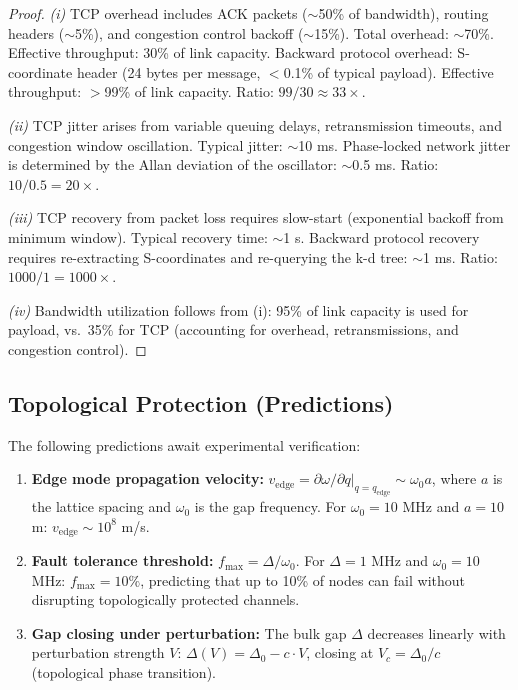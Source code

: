 \documentclass[11pt,twocolumn,a4paper]{article}
\theoremstyle{definition}
\begin{document}
\begin{proof}
\emph{(i)} TCP overhead includes ACK packets ($\sim$50\% of bandwidth), routing headers
($\sim$5\%), and congestion control backoff ($\sim$15\%). Total overhead: $\sim$70\%.
Effective throughput: 30\% of link capacity. Backward protocol overhead: S-coordinate
header (24 bytes per message, $<$0.1\% of typical payload). Effective throughput:
$>$99\% of link capacity. Ratio: $99/30 \approx 33\times$.

\emph{(ii)} TCP jitter arises from variable queuing delays, retransmission timeouts, and
congestion window oscillation. Typical jitter: $\sim$10 ms. Phase-locked network jitter
is determined by the Allan deviation of the oscillator: $\sim$0.5 ms. Ratio:
$10/0.5 = 20\times$.

\emph{(iii)} TCP recovery from packet loss requires slow-start (exponential backoff from
minimum window). Typical recovery time: $\sim$1 s. Backward protocol recovery requires
re-extracting S-coordinates and re-querying the k-d tree: $\sim$1 ms. Ratio:
$1000/1 = 1000\times$.

\emph{(iv)} Bandwidth utilization follows from (i): 95\% of link capacity is used for
payload, vs.\ 35\% for TCP (accounting for overhead, retransmissions, and congestion
control).
\end{proof}

\subsection{Topological Protection (Predictions)}\label{sec:exp:topology}

The following predictions await experimental verification:

\begin{enumerate}[label=(\roman*)]
  \item \textbf{Edge mode propagation velocity:} $v_{\mathrm{edge}} = \partial\omega/\partial q
        |_{q = q_{\mathrm{edge}}} \sim \omega_0 a$, where $a$ is the lattice spacing
        and $\omega_0$ is the gap frequency. For $\omega_0 = 10$ MHz and $a = 10$ m:
        $v_{\mathrm{edge}} \sim 10^8$ m/s.
  \item \textbf{Fault tolerance threshold:} $f_{\max} = \Delta/\omega_0$. For
        $\Delta = 1$ MHz and $\omega_0 = 10$ MHz: $f_{\max} = 10\%$, predicting that
        up to 10\% of nodes can fail without disrupting topologically protected channels.
  \item \textbf{Gap closing under perturbation:} The bulk gap $\Delta$ decreases linearly
        with perturbation strength $V$: $\Delta(V) = \Delta_0 - c \cdot V$, closing at
        $V_c = \Delta_0/c$ (topological phase transition).
\end{enumerate}
\end{document}
